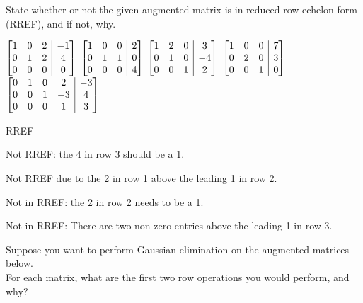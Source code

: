\documentclass[12pt]{exam}
\makeatletter
\newenvironment{amatrix}[1]{%
  \left[\begin{array}{@{}*{#1}{c}|c@{}}
}{%
  \end{array}\right]
}
\newcommand{\bam}{\begin{amatrix}}
\newcommand{\eam}{\end{amatrix}}
\makeatother
\begin{document}
\begin{questions}
\begin{multicols}{2}
\end{multicols}


\question State whether or not the given augmented matrix is in reduced row-echelon form (RREF), and if not, why.
\begin{multicols}{5}
$\bam{3}1&0&2&-1\\0&1&2&4\\0&0&0&0\eam$
\columnbreak
$\bam{3}1&0&0&2\\0&1&1&0\\0&0&0&4\eam$
\columnbreak
$\bam{3}1&2&0&3\\0&1&0&-4\\0&0&1&2\eam$
\columnbreak
$\bam{3}1&0&0&7\\0&2&0&3\\0&0&1&0\eam$
\columnbreak
$\bam{4}0&1&0&2&-3\\0&0&1&-3&4\\0&0&0&1&3\eam$
\end{multicols}
\begin{solution}[4cm]
\begin{multicols}{5}
RREF
\columnbreak

Not RREF: the 4 in row 3 should be a 1.\columnbreak

Not RREF due to the 2 in row 1 above the leading 1 in row 2.\columnbreak

Not in RREF: the 2 in row 2 needs to be a 1.
\columnbreak

Not in RREF: There are two non-zero entries above the leading 1 in row 3.
\end{multicols}
\end{solution}
\pagebreak

\question Suppose you want to perform Gaussian elimination on the augmented matrices below. \\For each matrix, what are the first two row operations you would perform, and why?



\end{questions}
\end{document}
